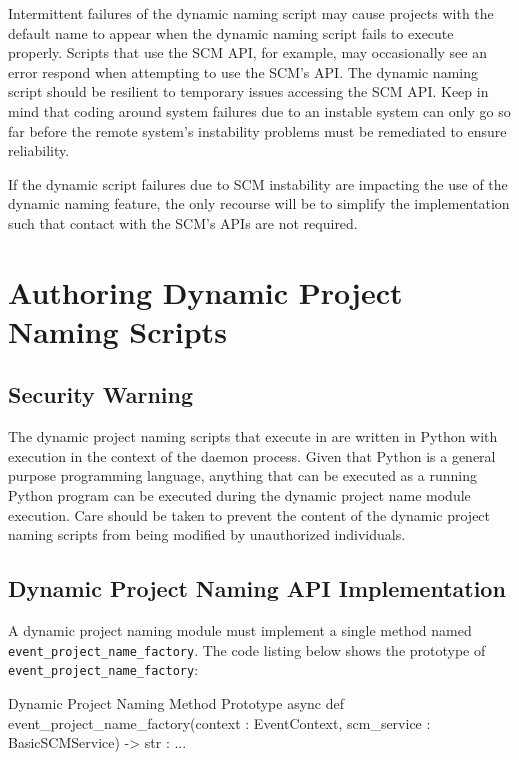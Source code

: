 Intermittent failures of the dynamic naming script may cause projects with the default name to appear when the dynamic
naming script fails to execute properly.  Scripts that use the SCM API, for example, may occasionally see an error
respond when attempting to use the SCM's API.  The dynamic naming script should be resilient to temporary issues
accessing the SCM API.  Keep in mind that coding around system failures due to an instable system can only go so
far before the remote system's instability problems must be remediated to ensure reliability.

If the dynamic script failures due to SCM instability are impacting the use of the dynamic naming feature, the
only recourse will be to simplify the implementation such that contact with the SCM's APIs are not required.


\section{Authoring Dynamic Project Naming Scripts}

\subsection{Security Warning}

The dynamic project naming scripts that execute in \cxoneflow are written in Python with execution in the context of
the \cxoneflow daemon process.  Given that Python is a general purpose programming language, anything that can be executed
as a running Python program can be executed during the dynamic project name module execution.  Care should be taken to
prevent the content of the dynamic project naming scripts from being modified by unauthorized individuals.

\subsection{Dynamic Project Naming API Implementation}

A dynamic project naming module must implement a single method named \texttt{event\_project\_name\_factory}. The code
listing below shows the prototype of \texttt{event\_project\_name\_factory}:

\begin{code}{Dynamic Project Naming Method Prototype}{}{}
async def event_project_name_factory(context : EventContext, scm_service : BasicSCMService) -> str : ...
\end{code}

